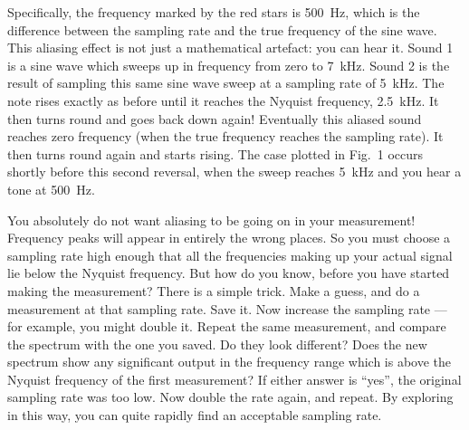
  Specifically, the frequency marked by the red stars is 500~Hz, which is the 
  difference between the sampling rate and the true frequency of the sine wave. 
  This aliasing effect is not just a mathematical artefact: you can hear it. 
  Sound 1 is a sine wave which sweeps up in frequency from zero to 7~kHz. Sound 
  2 is the result of sampling this same sine wave sweep at a sampling rate of 
  5~kHz. The note rises exactly as before until it reaches the Nyquist 
  frequency, 2.5~kHz. It then turns round and goes back down again! Eventually 
  this aliased sound reaches zero frequency (when the true frequency reaches 
  the sampling rate). It then turns round again and starts rising. The case 
  plotted in Fig.\ 1 occurs shortly before this second reversal, when the sweep 
  reaches 5~kHz and you hear a tone at 500~Hz. 



  You absolutely do not want aliasing to be going on in your measurement! 
  Frequency peaks will appear in entirely the wrong places. So you must choose 
  a sampling rate high enough that all the frequencies making up your actual 
  signal lie below the Nyquist frequency. But how do you know, before you have 
  started making the measurement? There is a simple trick. Make a guess, and do 
  a measurement at that sampling rate. Save it. Now increase the sampling rate 
  — for example, you might double it. Repeat the same measurement, and compare 
  the spectrum with the one you saved. Do they look different? Does the new 
  spectrum show any significant output in the frequency range which is above 
  the Nyquist frequency of the first measurement? If either answer is “yes”, 
  the original sampling rate was too low. Now double the rate again, and 
  repeat. By exploring in this way, you can quite rapidly find an acceptable 
  sampling rate. 

